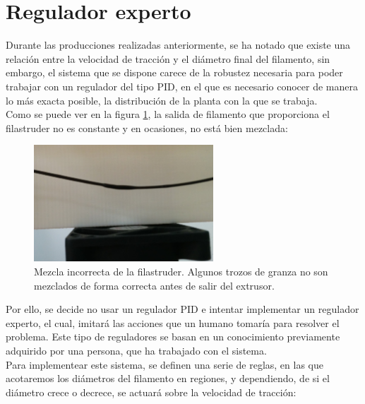 \section{Regulador experto}
\label{sec:reg_expt}

Durante las producciones realizadas anteriormente, se ha notado que existe una relación entre la velocidad de tracción y el diámetro final del filamento, sin embargo, el sistema que se dispone carece de la robustez necesaria para poder trabajar con un regulador del tipo PID, en el que es necesario conocer de manera lo más exacta posible, la distribución de la planta con la que se trabaja.\\

Como se puede ver en la figura \ref{fig:reg_mezcla}, la salida de filamento que proporciona el filastruder no es constante y en ocasiones, no está bien mezclada:

\begin{figure}[H]
    \centering
    \includegraphics[width=0.6\textwidth]{images/producciones/22072015/IMG_20150722_120959.jpg}
    \caption[Mezcla incorrecta de la filastruder.]{Mezcla incorrecta de la filastruder. Algunos trozos de granza no son mezclados de forma correcta antes de salir del extrusor.}
    \label{fig:reg_mezcla}
\end{figure}

Por ello, se decide no usar un regulador PID e intentar implementar un regulador experto, el cual, imitará las acciones que un humano tomaría para resolver el problema. Este tipo de reguladores se basan en un conocimiento previamente adquirido por una persona, que ha trabajado con el sistema.\\

Para implementear este sistema, se definen una serie de reglas, en las que acotaremos los diámetros del filamento en regiones, y dependiendo, de si el diámetro crece o decrece, se actuará sobre la velocidad de tracción:

